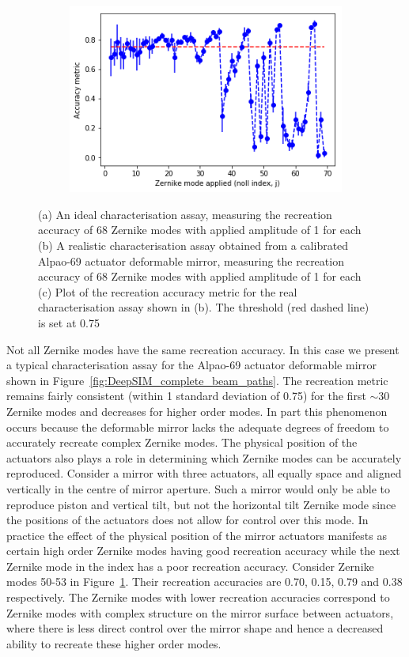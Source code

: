 \begin{figure}[h]
	\begin{subfigure}{0.9\textwidth}
		\centering
		\includegraphics[width=0.6\linewidth, scale=0.5]{./images/real_characterisation_assay_plot_metric_errorbar.png}
		\caption{}
		\label{fig:real_characterisation_assay_plot_metric_errorbar}
	\end{subfigure}
	\caption{(a) An ideal characterisation assay, measuring the recreation accuracy of 68 Zernike modes with applied amplitude of 1 for each (b) A realistic characterisation assay obtained from a calibrated Alpao-69 actuator deformable mirror, measuring the recreation accuracy of 68 Zernike modes with applied amplitude of 1 for each (c) Plot of the recreation accuracy metric for the real characterisation assay shown in (b). The threshold (red dashed line) is set at 0.75}
	\label{fig:characterisation_assay_results}
\end{figure}

Not all Zernike modes have the same recreation accuracy. In this case we present a typical characterisation assay for the Alpao-69 actuator deformable mirror shown in  Figure~\ref{fig:DeepSIM_complete_beam_paths}. The recreation metric remains 
fairly consistent (within 1 standard deviation of 0.75) for the first $\sim$30 Zernike modes and decreases for higher order modes. In part this phenomenon occurs because the deformable mirror lacks the adequate degrees of freedom to accurately recreate complex Zernike modes. The physical position of the actuators also plays a role in determining which Zernike modes can be accurately reproduced. Consider a mirror with three actuators, all equally space and aligned vertically in the centre of mirror aperture. Such a mirror would only be able to reproduce piston and vertical tilt, but not the horizontal tilt Zernike mode since the positions of the actuators does not allow for control over 
this mode. In practice the effect of the physical position of the mirror actuators manifests as certain high order Zernike modes having good recreation accuracy while the next Zernike mode in the index has a poor recreation accuracy. Consider Zernike modes 50-53 in Figure~\ref{fig:real_characterisation_assay_plot_metric_errorbar}.
Their recreation accuracies are 0.70, 0.15, 0.79 and 0.38 respectively. The Zernike modes with lower recreation accuracies correspond to Zernike modes with complex structure on the mirror surface between actuators, where there is less direct control over the mirror shape and hence a decreased ability to recreate these higher order modes. 

